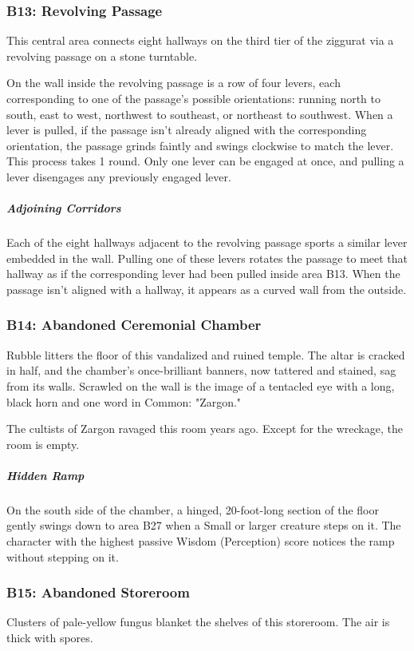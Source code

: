\documentclass[10pt,a4paper,twoside,bg=print,twocolumn,openany,nodeprecatedcode]{dndbook}
\begin{document}
\subsubsection{B13: Revolving Passage}
This central area connects eight hallways on the third tier of the ziggurat via a revolving passage on a stone turntable.

On the wall inside the revolving passage is a row of four levers, each corresponding to one of the passage's possible orientations: running north to south, east to west, northwest to southeast, or northeast to southwest. When a lever is pulled, if the passage isn't already aligned with the corresponding orientation, the passage grinds faintly and swings clockwise to match the lever. This process takes 1 round. Only one lever can be engaged at once, and pulling a lever disengages any previously engaged lever.

\subparagraph{Adjoining Corridors}
Each of the eight hallways adjacent to the revolving passage sports a similar lever embedded in the wall. Pulling one of these levers rotates the passage to meet that hallway as if the corresponding lever had been pulled inside area B13. When the passage isn't aligned with a hallway, it appears as a curved wall from the outside.

\subsubsection{B14: Abandoned Ceremonial Chamber}
\begin{DndReadAloud}{}
Rubble litters the floor of this vandalized and ruined temple. The altar is cracked in half, and the chamber's once-brilliant banners, now tattered and stained, sag from its walls. Scrawled on the wall is the image of a tentacled eye with a long, black horn and one word in Common: "Zargon."

\end{DndReadAloud}

The cultists of Zargon ravaged this room years ago. Except for the wreckage, the room is empty.

\subparagraph{Hidden Ramp}
On the south side of the chamber, a hinged, 20-foot-long section of the floor gently swings down to area B27 when a Small or larger creature steps on it. The character with the highest passive Wisdom (Perception) score notices the ramp without stepping on it.

\subsubsection{B15: Abandoned Storeroom}
\begin{DndReadAloud}{}
Clusters of pale-yellow fungus blanket the shelves of this storeroom. The air is thick with spores.

\end{DndReadAloud}
\end{document}
